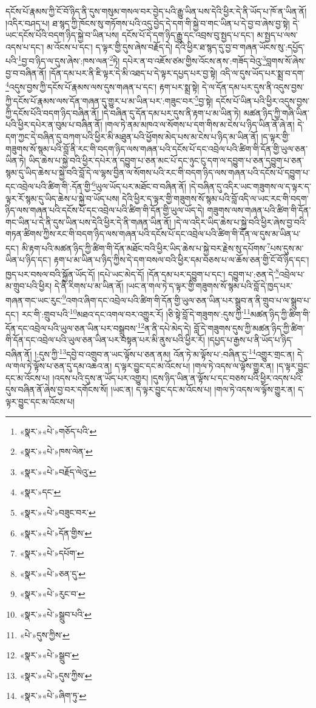 དངོས་པོ་རྣམས་ཀྱི་ངོ་བོ་ཉིད་ནི་དུས་གསུམ་གསལ་བར་བྱེད་པའི་རྒྱུ་ཡིན་པས་དེའི་ཕྱིར་དེ་ནི་ཡོད་པ་ཁོ་ན་ཡིན་ནོ། །འདིར་བཤད་པ། ཐ་སྙད་ཀྱི་ཁོངས་སུ་གཏོགས་པའི་འདུ་བྱེད་དེ་དག་གི་སྐྱེ་བ་གང་ཡིན་པ་དེ་བྱ་བ་ཞེས་བྱ་སྟེ། དེ་ཡང་དངོས་པོའི་བདག་ཉིད་སྐྱེ་བ་ཡིན་པས། དངོས་པོ་དེ་དག་ཉིད་རྒྱུ་དང་འབྲས་བུ་སྤྱད་པ་དང་། མ་སྤྱད་པ་ལས་འདས་པ་དང་། མ་འོངས་པ་དང་། ད་ལྟར་གྱི་དུས་ཞེས་བརྗོད་དེ། དེའི་ཕྱིར་ཐ་སྙད་དུ་བྱ་བ་གཞན་ཡོངས་སུ་:དཔྱོད་པའི་\footnote{«སྣར་»«པེ་»གཅོད་པའི་}བྱ་བ་ཉིད་ལ་དུས་ཞེས་:ཁས་ལན་\footnote{«སྣར་»«པེ་»ཁས་ལེན་}ཏེ། དཔེར་ན་བ་འཇོས་ཙམ་གྱིས་འོངས་ནས་:གཟོད་བེའུ་\footnote{«སྣར་»«པེ་»བརྗོད་ལེའུ་}བླགས་སོ་ཞེས་བྱ་བ་བཞིན་ནོ། །དོན་དམ་པར་ནི་ཇི་ལྟར་དེ་མི་འཐད་པ་དེ་ལྟར་དཔྱད་པར་བྱ་སྟེ། འདི་ལ་དུས་ཡོད་པར་སྨྲ་བ་དག་\footnote{«སྣར་»དང་}འདུས་བྱས་ཀྱི་དངོས་པོ་རྣམས་ལས་དུས་གཞན་པ་དང་། རྟག་པར་སྨྲ་སྟེ། དེ་ལ་དོན་དམ་པར་དུས་ནི་འདུས་བྱས་ཀྱི་དངོས་པོ་རྣམས་ལས་དོན་གཞན་དུ་གྱུར་པ་མ་ཡིན་པར་:གཟུང་བར་\footnote{«སྣར་»«པེ་»བཟུང་བར་}བྱ་སྟེ། དངོས་པོ་ཡིན་པའི་ཕྱིར་འདུས་བྱས་ཀྱི་དངོས་པོའི་བདག་ཉིད་བཞིན་ནོ། །དེ་བཞིན་དུ་དོན་དམ་པར་དུས་ནི་རྟག་པ་མ་ཡིན་ཏེ། མཚན་ཉིད་ཀྱི་གཞི་ཡིན་པའི་ཕྱིར་དཔེར་ན་བུམ་པ་བཞིན་ནོ། །གལ་ཏེ་ནམ་མཁའ་ལ་སོགས་པ་དག་གིས་མ་ངེས་པ་ཉིད་ཡིན་ནོ་ཞེ་ན། དེ་དག་ཀྱང་དེ་བཞིན་དུ་བཀག་པའི་ཕྱིར་མི་མཐུན་པའི་ཕྱོགས་མེད་པས་མ་ངེས་པ་ཉིད་མ་ཡིན་ནོ། །ད་ལྟར་གྱི་གཟུགས་སོ་སྙམ་པའི་བློ་ནི་རང་གི་བདག་ཉིད་ལས་གཞན་པའི་དངོས་པོ་དང་འབྲེལ་པའི་ཚིག་གི་དོན་གྱི་ཡུལ་ཅན་ཡིན་ཏེ། ཡིད་ཆེས་པ་སྐྱེ་བའི་ཕྱིར་དཔེར་ན་དབྱུག་པ་ཅན་མང་པོ་དང་ཉུང་ངུ་དག་ལ་དབྱུག་པ་ཅན་དབྱུག་པ་ཅན་སྙམ་དུ་ཡིད་ཆེས་པ་སྐྱེ་བའི་བློ་དེ་ལ་ལྷས་བྱིན་ལ་སོགས་པའི་རང་གི་བདག་ཉིད་ལས་གཞན་པའི་དངོས་པོ་དབྱུག་པ་དང་འབྲེལ་པའི་ཚིག་གི་:དོན་གྱི་\footnote{«སྣར་»«པེ་»དོན་གྱིས་}ཡུལ་ཡོད་པར་མཐོང་བ་བཞིན་ནོ། །དེ་བཞིན་དུ་འདིར་ཡང་གཟུགས་ལ་ད་ལྟར་ད་ལྟར་རོ་སྙམ་དུ་ཡིད་ཆེས་པ་སྐྱེ་བ་ཡོད་པས། དེའི་ཕྱིར་ད་ལྟར་གྱི་གཟུགས་སོ་སྙམ་པའི་བློ་འདི་ལ་ཡང་རང་གི་བདག་ཉིད་ལས་གཞན་པའི་དངོས་པོ་དང་འབྲེལ་པའི་ཚིག་གི་དོན་གྱི་ཡུལ་ཡོད་དེ། གཟུགས་ལས་གཞན་པའི་ཚིག་གི་དོན་གང་ཡིན་པ་དེ་ནི་དུས་ཡིན་པས་དེའི་ཕྱིར་དེ་ནི་གཞན་ཡིན་ནོ། །དེ་ལ་འདིར་ཡིད་ཆེས་པ་སྐྱེ་བའི་ཕྱིར་ཞེས་བྱ་བའི་གཏན་ཚིགས་ཀྱིས་རང་གི་བདག་ཉིད་ལས་གཞན་པའི་དངོས་པོ་དང་འབྲེལ་པའི་ཚིག་གི་དོན་ལ་དུས་མ་ཡིན་པ་དང་། མི་རྟག་པའི་མཚན་ཉིད་ཀྱི་ཚིག་གི་དོན་མཐོང་བའི་ཕྱིར་ཡིད་ཆེས་པ་སྐྱེ་བར་རྗེས་སུ་དཔོགས་\footnote{«སྣར་»«པེ་»དཔོག་}པས་དུས་མ་ཡིན་པ་ཉིད་དང་། རྟག་པ་མ་ཡིན་པ་ཉིད་ཀྱིས་དེ་དག་བསལ་བའི་ཕྱིར་དམ་བཅས་པ་ལ་ཆོས་ཅན་གྱི་ངོ་བོ་ཉིད་དང་། ཁྱད་པར་བསལ་བའི་སྐྱོན་ཡོད་དོ། །དཔེ་ཡང་མེད་དོ། །དོན་དམ་པར་དབྱུག་པ་དང་། དབྱུག་པ་:ཅན་དེ་\footnote{«སྣར་»«པེ་»ཅན་དུ་}འབྲེལ་པ་མ་གྲུབ་པའི་ཕྱིར། དེ་ནི་རིགས་པ་མ་ཡིན་ནོ། །ཡང་ན་གལ་ཏེ་ད་ལྟར་གྱི་གཟུགས་སོ་སྙམ་པའི་བློ་དེ་ཁྱད་པར་གཞན་གང་ཡང་རུང་\footnote{«སྣར་»«པེ་»རུང་བ་}འགའ་ཞིག་དང་འབྲེལ་པའི་ཚིག་གི་དོན་གྱི་ཡུལ་ཅན་ཡིན་པར་སྒྲུབ་ན་ནི་གྲུབ་པ་ལ་སྒྲུབ་པ་དང་། རང་གི་:གྲུབ་པའི་\footnote{«སྣར་»«པེ་»སྒྲུབ་པའི་}མཐའ་དང་འགལ་བར་འགྱུར་རོ། །ཅི་སྟེ་བློ་དེ་གཟུགས་:དུས་ཀྱི་\footnote{«པེ་»དུས་ཀྱིས་}མཚན་ཉིད་ཀྱི་ཚིག་གི་དོན་དང་འབྲེལ་པའི་ཡུལ་ཅན་ཡིན་པར་བསྒྲུབས་\footnote{«སྣར་»«པེ་»སྒྲུབ་}ན་ནི་དཔེ་མེད་དེ། བློ་དེ་གཟུགས་དུས་ཀྱི་མཚན་ཉིད་ཀྱི་ཚིག་གི་དོན་དང་འབྲེལ་པའི་ཡུལ་ཅན་ཡིན་པར་བསྟན་པར་མི་ནུས་པའི་ཕྱིར་རོ། །དཔྱད་པ་རྒྱས་པ་ནི་ཡོད་པ་ཉིད་བཞིན་ནོ། །:དུས་ཀྱི་\footnote{«སྣར་»«པེ་»དུས་ཀྱིས་}དབྱེ་བ་འགྲུབ་ན་ཡང་ལྟོས་པ་ཅན་ནམ། འོན་ཏེ་མ་ལྟོས་པ་:བཞིན་དུ་\footnote{«སྣར་»«པེ་»ཞིག་ཏུ་}འགྱུར་གྲང་ན། དེ་ལ་གལ་ཏེ་ལྟོས་པ་ཅན་དུ་དམ་འཆའ་ན། ད་ལྟར་བྱུང་དང་མ་འོངས་པ། །གལ་ཏེ་འདས་ལ་ལྟོས་གྱུར་ན། །ད་ལྟར་བྱུང་དང་མ་འོངས་པ། །འདས་པའི་དུས་ན་ཡོད་པར་འགྱུར། །དུས་ཉིད་ཡིན་ན་ལྟོས་པ་དང་བཅས་པའི་ཕྱིར་འདས་པའི་དུས་བཞིན་ནོ་ཞེས་བྱ་བར་དགོངས་སོ། །ཡང་ན། ད་ལྟར་བྱུང་དང་མ་འོངས་པ། །གལ་ཏེ་འདས་ལ་ལྟོས་གྱུར་ན། ད་ལྟར་བྱུང་དང་མ་འོངས་པ། 